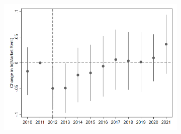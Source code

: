 \documentclass[12pt]{article}
\begin{document}
{{{{{{\begin{figure}[h!]
\begin{center}
\begin{subfigure}[b]{0.6\textwidth}
\includegraphics[scale = 0.45]{Street Easy Rents/R7 High Surge Rent Impacts_8_1.png}
\label{fig:highsurgemktcontrols}
\end{subfigure}
\end{center}
\end{figure}





}}}}}}
\end{document}
